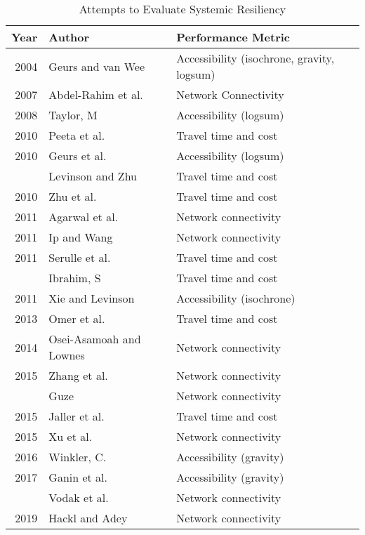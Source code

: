 \documentclass[]{ascelike-new}
\begin{document}
\hypertarget{tbl-authortable}{}
\begin{table}
\caption{\label{tbl-authortable}Attempts to Evaluate Systemic Resiliency }\tabularnewline

\centering
\begin{tabular}[t]{rll}
\toprule
Year & Author & Performance Metric\\
\midrule
2004 & Geurs and van Wee & Accessibility (isochrone, gravity, logsum)\\
2007 & Abdel-Rahim et al. & Network Connectivity\\
2008 & Taylor, M & Accessibility (logsum)\\
2010 & Peeta et al. & Travel time and cost\\
2010 & Geurs et al. & Accessibility (logsum)\\
\addlinespace
2010 & Levinson and Zhu & Travel time and cost\\
2010 & Zhu et al. & Travel time and cost\\
2011 & Agarwal et al. & Network connectivity\\
2011 & Ip and Wang & Network connectivity\\
2011 & Serulle et al. & Travel time and cost\\
\addlinespace
2011 & Ibrahim, S & Travel time and cost\\
2011 & Xie and Levinson & Accessibility (isochrone)\\
2013 & Omer et al. & Travel time and cost\\
2014 & Osei-Asamoah and Lownes & Network connectivity\\
2015 & Zhang et al. & Network connectivity\\
\addlinespace
2015 & Guze & Network connectivity\\
2015 & Jaller et al. & Travel time and cost\\
2015 & Xu et al. & Network connectivity\\
2016 & Winkler, C. & Accessibility (gravity)\\
2017 & Ganin et al. & Accessibility (gravity)\\
\addlinespace
2019 & Vodak et al. & Network connectivity\\
2019 & Hackl and Adey & Network connectivity\\
\bottomrule
\end{tabular}
\end{table}
\end{document}
